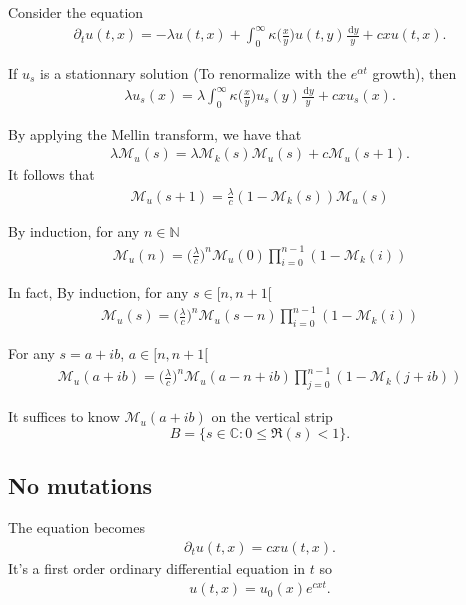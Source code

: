 \documentclass{article}
\newcommand{\diff}{\,\mathrm{d}}
\newcommand{\CC}{\mathbb{C}}
\begin{document}
Consider the equation
\begin{align*}
    \partial_t u(t,x) = -\lambda u(t,x) + \int_0^\infty \kappa\Big(\frac{x}{y}\Big)u(t,y)\frac{\diff y}{y} + cxu(t,x).
\end{align*}

If $u_s$ is a stationnary solution (To renormalize with the $e^{\alpha t}$ growth), then
\begin{align*}
    \lambda u_s(x) = \lambda\int_0^\infty \kappa\Big(\frac{x}{y}\Big)u_s(y)\frac{\diff y}{y} + cxu_s(x).
\end{align*} 

By applying the Mellin transform, we have that
\begin{align*}
    \lambda \mathcal{M}_u(s) =\lambda \mathcal{M}_k(s)\mathcal{M}_u(s) + c\mathcal{M}_u(s+1).
\end{align*}
It follows that 
\begin{align*}
    \mathcal{M}_u(s+1) = \frac{\lambda}{c}(1 - \mathcal{M}_k(s))\mathcal{M}_u(s)
\end{align*}

By induction, for any $n\in \mathbb{N}$
\begin{align*}
    \mathcal{M}_u(n) = \Big(\frac{\lambda}{c}\Big)^n \mathcal{M}_u(0) \prod_{i = 0}^{n-1}(1 - \mathcal{M}_k(i))
\end{align*}

In fact, 
By induction, for any $s\in [n, n+1[$
\begin{align*}
    \mathcal{M}_u(s) = \Big(\frac{\lambda}{c}\Big)^n \mathcal{M}_u(s-n) \prod_{i = 0}^{n-1}(1 - \mathcal{M}_k(i))
\end{align*}

For any $s = a + ib$, $a \in [n, n+1[$
\begin{align*}
    \mathcal{M}_u(a+ib) = \Big(\frac{\lambda}{c}\Big)^n \mathcal{M}_u(a-n + ib) \prod_{j = 0}^{n-1}(1 - \mathcal{M}_k(j + ib))
\end{align*} 

It suffices to know $\mathcal{M}_u(a+ib)$ on the vertical strip 
$$B = \{s \in \CC : 0 \leq \mathfrak{R}(s) < 1 \}.$$

\subsection{No mutations}
The equation becomes
\begin{align*}
    \partial_t u(t,x) = cxu(t,x).
\end{align*}
It's a first order ordinary differential equation in $t$ so 
\begin{align*}
    u(t,x) = u_0(x)e^{cxt}.
\end{align*}
\end{document}
